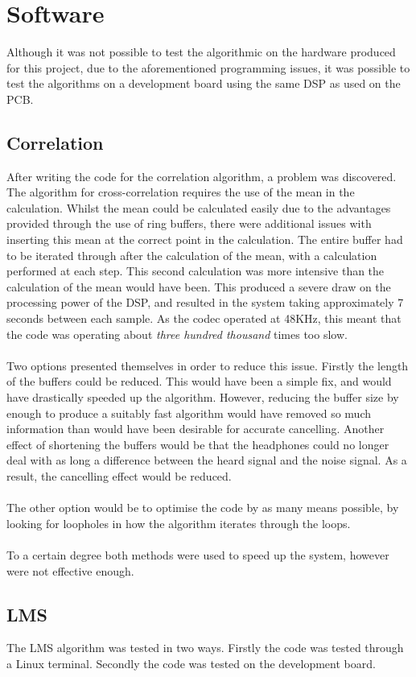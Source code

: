 \section{Software}

Although it was not possible to test the algorithmic on the hardware produced for this project, due to the aforementioned programming issues, it was possible to test the algorithms on a development board using the same DSP as used on the PCB.

\subsection{Correlation}
After writing the code for the correlation algorithm, a problem was discovered.
The algorithm for cross-correlation requires the use of the mean in the calculation.
Whilst the mean could be calculated easily due to the advantages provided through the use of ring buffers, there were additional issues with inserting this mean at the correct point in the calculation.
The entire buffer had to be iterated through after the calculation of the mean, with a calculation performed at each step.
This second calculation was more intensive than the calculation of the mean would have been.
This produced a severe draw on the processing power of the DSP, and resulted in the system taking approximately 7 seconds between each sample.
As the codec operated at 48KHz, this meant that the code was operating about \emph{three hundred thousand} times too slow.
\\
\\
Two options presented themselves in order to reduce this issue.
Firstly the length of the buffers could be reduced.
This would have been a simple fix, and would have drastically speeded up the algorithm.
However, reducing the buffer size by enough to produce a suitably fast algorithm would have removed so much information than would have been desirable for accurate cancelling.
Another effect of shortening the buffers would be that the headphones could no longer deal with as long a difference between the heard signal and the noise signal.
As a result, the cancelling effect would be reduced.
\\
\\
The other option would be to optimise the code by as many means possible, by looking for loopholes in how the algorithm iterates through the loops.
\\
\\
To a certain degree both methods were used to speed up the system, however were not effective enough.

\subsection{LMS}

The LMS algorithm was tested in two ways.
Firstly the code was tested through a Linux terminal.
Secondly the code was tested on the development board.
